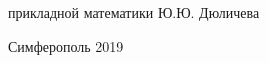 \begin{titlepage}
    прикладной математики  \hspace*{5cm} Ю.Ю. Дюличева
    
    
    
    
    \vspace{\fill}

    \begin{center}
    Симферополь 2019
    \end{center}

    \end{titlepage}